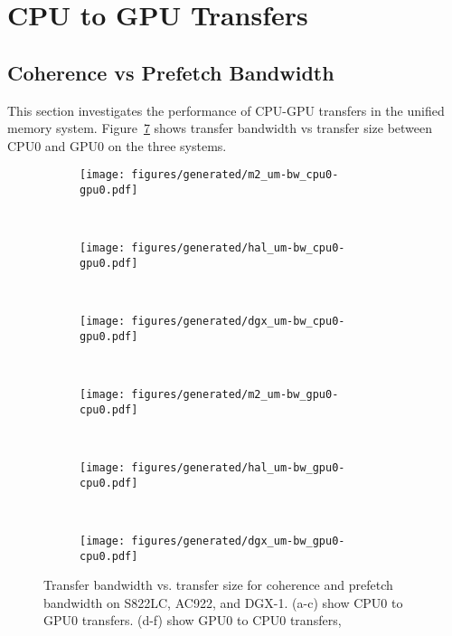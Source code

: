 \section{CPU to GPU Transfers}
\label{sec:um-cpu-gpu}

\subsection{Coherence vs Prefetch Bandwidth}
This section investigates the performance of CPU-GPU transfers in the unified memory system.
Figure~\ref{fig:um-cpu0-gpu0} shows transfer bandwidth vs transfer size between CPU0 and GPU0 on the three systems.

\begin{figure}[ht]
    \centering
    \begin{subfigure}[b]{0.31\textwidth}
        \texttt{[image: figures/generated/m2\_um-bw\_cpu0-gpu0.pdf]}
        \caption{}
        \label{}
    \end{subfigure}
    ~
    \begin{subfigure}[b]{0.31\textwidth}
        \texttt{[image: figures/generated/hal\_um-bw\_cpu0-gpu0.pdf]}
        \caption{}
        \label{}
    \end{subfigure}
    ~
    \begin{subfigure}[b]{0.31\textwidth}
        \texttt{[image: figures/generated/dgx\_um-bw\_cpu0-gpu0.pdf]}
        \caption{}
        \label{}
    \end{subfigure}
    \\
    \begin{subfigure}[b]{0.31\textwidth}
        \texttt{[image: figures/generated/m2\_um-bw\_gpu0-cpu0.pdf]}
        \caption{}
        \label{}
    \end{subfigure}
    ~
    \begin{subfigure}[b]{0.31\textwidth}
        \texttt{[image: figures/generated/hal\_um-bw\_gpu0-cpu0.pdf]}
        \caption{}
        \label{}
    \end{subfigure}
    ~
    \begin{subfigure}[b]{0.31\textwidth}
        \texttt{[image: figures/generated/dgx\_um-bw\_gpu0-cpu0.pdf]}
        \caption{}
        \label{}
    \end{subfigure}
    \caption[]{
        Transfer bandwidth vs. transfer size for coherence and prefetch bandwidth on S822LC, AC922, and DGX-1.
        (a-c) show CPU0 to GPU0 transfers.
        (d-f) show GPU0 to CPU0 transfers,
    }
    \label{fig:um-cpu0-gpu0}
\end{figure}

